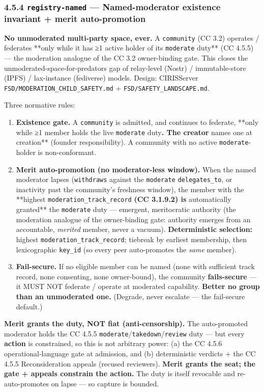 \documentclass[11pt]{article}
\begin{document}
\subsubsection*{4.5.4 \texttt{registry-named} — Named-moderator existence invariant + merit auto-promotion}


\textbf{No unmoderated multi-party space, ever.} A \texttt{community} (CC 3.2) operates / federates **only while it has ≥1 active holder of its \texttt{moderate} duty** (CC 4.5.5) — the moderation analogue of the CC 3.2 owner-binding gate. This closes the unmoderated-space-for-predators gap of relay-level (Nostr) / immutable-store (IPFS) / lax-instance (fediverse) models. Design: CIRISServer \texttt{FSD/MODERATION\_CHILD\_SAFETY.md} + \texttt{FSD/SAFETY\_LANDSCAPE.md}.


Three normative rules:


\begin{enumerate}\setlength\itemsep{0pt}
\item \textbf{Existence gate.} A \texttt{community} is admitted, and continues to federate, **only while ≥1 member holds the live \texttt{moderate} duty\textbf{. The creator }names one at creation** (founder responsibility). A community with no active \texttt{moderate}-holder is non-conformant.
\item \textbf{Merit auto-promotion (no moderator-less window).} When the named moderator lapses (\texttt{withdraws} against the \texttt{moderate} \texttt{delegates\_to}, or inactivity past the community's freshness window), the member with the **highest \texttt{moderation\_track\_record}\textbf{ (CC 3.1.9.2) is }automatically granted** the \texttt{moderate} duty — emergent, meritocratic authority (the moderation analogue of the owner-binding gate: authority emerges from an accountable, \textit{merited} member, never a vacuum). \textbf{Deterministic selection:} highest \texttt{moderation\_track\_record}; tiebreak by earliest membership, then lexicographic \texttt{key\_id} (so every peer auto-promotes the \textit{same} member).
\item \textbf{Fail-secure.} If no eligible member can be named (none with sufficient track record, none consenting, none owner-bound), the community \textbf{fails-secure} — it MUST NOT federate / operate at moderated capability. \textbf{Better no group than an unmoderated one.} (Degrade, never escalate — the fail-secure default.)
\end{enumerate}



\textbf{Merit grants the duty, NOT fiat (anti-censorship).} The auto-promoted moderator holds the CC 4.5.5 \texttt{moderate}/\texttt{takedown}/\texttt{review} duty — but every \textbf{action} is constrained, so this is not arbitrary power: (a) the CC 4.5.6 operational-language gate at admission, and (b) deterministic verdicts + the CC 4.5.5 Reconsideration appeals (recused reviewers). \textbf{Merit grants the seat; the gate + appeals constrain the action.} The duty is itself revocable and re-auto-promotes on lapse — so capture is bounded.
\end{document}
